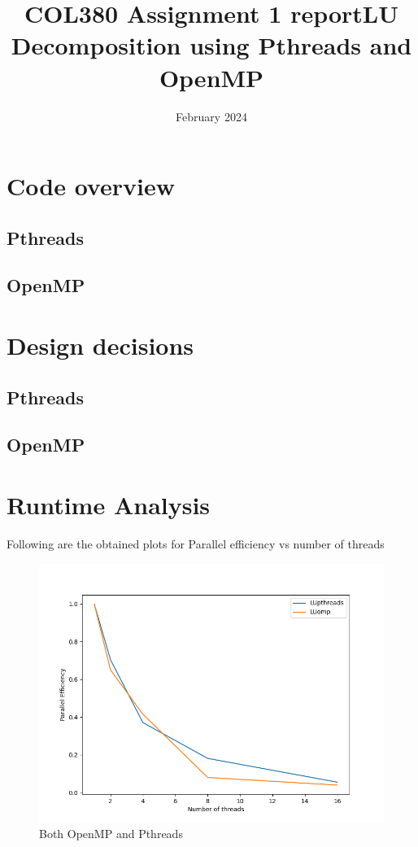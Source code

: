 \documentclass{article}
\title{COL380 Assignment 1 report}
\title{LU Decomposition using Pthreads and OpenMP}
\date{February 2024}
\begin{document}
\maketitle

\section{Code overview}
\subsection{Pthreads}

\subsection{OpenMP}

\section{Design decisions}

\subsection{Pthreads}

\subsection{OpenMP}


\section{Runtime Analysis}

Following are the obtained plots for Parallel efficiency vs number of threads

%

\begin{figure}[!htb]
    \centering
    \includegraphics[width=13cm]{Both.png}
    \caption{Both OpenMP and Pthreads}
\end{figure}
\end{document}

